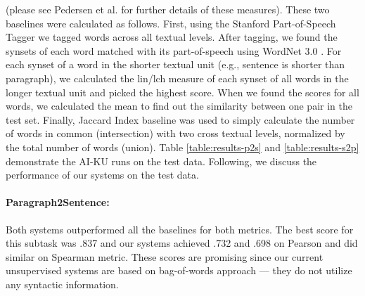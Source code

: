 \documentclass[11pt]{article}
\begin{document}
(please see Pedersen et al.  for further details of these measures). These two baselines were calculated as follows. First, using the Stanford Part-of-Speech Tagger \cite{toutanova2000enriching} we tagged words across all textual levels. After tagging, we found the synsets of each word matched with its part-of-speech using WordNet 3.0 \cite{fellbaum98electronic}. For each synset of a word in the shorter textual unit (e.g., sentence is shorter than paragraph), we calculated the lin/lch measure of each synset of all words in the longer textual unit and picked the highest score. When we found the scores for all words, we calculated 
the mean to find out the similarity between one pair in the test set. Finally, Jaccard Index baseline was used to simply 
calculate the number of words in common (intersection) with two cross textual levels, normalized by the total number of words (union). Table \ref{table:results-p2s} and \ref{table:results-s2p} demonstrate the AI-KU runs on the test data. Following, we discuss the performance of our systems on the test data.




\paragraph{Paragraph2Sentence:} Both systems outperformed all the baselines for both metrics. The best score for this subtask was .837 and our systems achieved .732 and .698 on Pearson and did similar on Spearman metric. These scores are promising since our current unsupervised systems are based on bag-of-words approach --- they do not utilize any syntactic information.

\begin{table}[hr]
\begin{center}
\end{center}
\caption{\label{table:results-s2p} Sentence2phrase subtask scores for the test data.}
\end{table}
\end{document}

